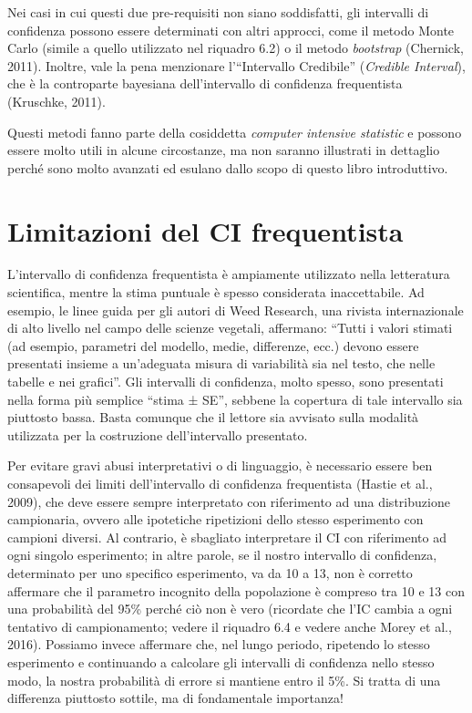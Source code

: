 \documentclass[
  12pt,
]{book}
\begin{document}
Nei casi in cui questi due pre-requisiti non siano soddisfatti, gli intervalli di confidenza possono essere determinati con altri approcci, come il metodo Monte Carlo (simile a quello utilizzato nel riquadro 6.2) o il metodo \emph{bootstrap} (Chernick, 2011). Inoltre, vale la pena menzionare l'``Intervallo Credibile'' (\emph{Credible Interval}), che è la controparte bayesiana dell'intervallo di confidenza frequentista (Kruschke, 2011).

Questi metodi fanno parte della cosiddetta \emph{computer intensive statistic} e possono essere molto utili in alcune circostanze, ma non saranno illustrati in dettaglio perché sono molto avanzati ed esulano dallo scopo di questo libro introduttivo.

\hypertarget{limitazioni-del-ci-frequentista}{%
\section{Limitazioni del CI frequentista}\label{limitazioni-del-ci-frequentista}}

L'intervallo di confidenza frequentista è ampiamente utilizzato nella letteratura scientifica, mentre la stima puntuale è spesso considerata inaccettabile. Ad esempio, le linee guida per gli autori di Weed Research, una rivista internazionale di alto livello nel campo delle scienze vegetali, affermano: ``Tutti i valori stimati (ad esempio, parametri del modello, medie, differenze, ecc.) devono essere presentati insieme a un'adeguata misura di variabilità sia nel testo, che nelle tabelle e nei grafici''. Gli intervalli di confidenza, molto spesso, sono presentati nella forma più semplice ``stima ± SE'', sebbene la copertura di tale intervallo sia piuttosto bassa. Basta comunque che il lettore sia avvisato sulla modalità utilizzata per la costruzione dell'intervallo presentato.

Per evitare gravi abusi interpretativi o di linguaggio, è necessario essere ben consapevoli dei limiti dell'intervallo di confidenza frequentista (Hastie et al., 2009), che deve essere sempre interpretato con riferimento ad una distribuzione campionaria, ovvero alle ipotetiche ripetizioni dello stesso esperimento con campioni diversi. Al contrario, è sbagliato interpretare il CI con riferimento ad ogni singolo esperimento; in altre parole, se il nostro intervallo di confidenza, determinato per uno specifico esperimento, va da 10 a 13, non è corretto affermare che il parametro incognito della popolazione è compreso tra 10 e 13 con una probabilità del 95\% perché ciò non è vero (ricordate che l'IC cambia a ogni tentativo di campionamento; vedere il riquadro 6.4 e vedere anche Morey et al., 2016). Possiamo invece affermare che, nel lungo periodo, ripetendo lo stesso esperimento e continuando a calcolare gli intervalli di confidenza nello stesso modo, la nostra probabilità di errore si mantiene entro il 5\%. Si tratta di una differenza piuttosto sottile, ma di fondamentale importanza!
\end{document}
